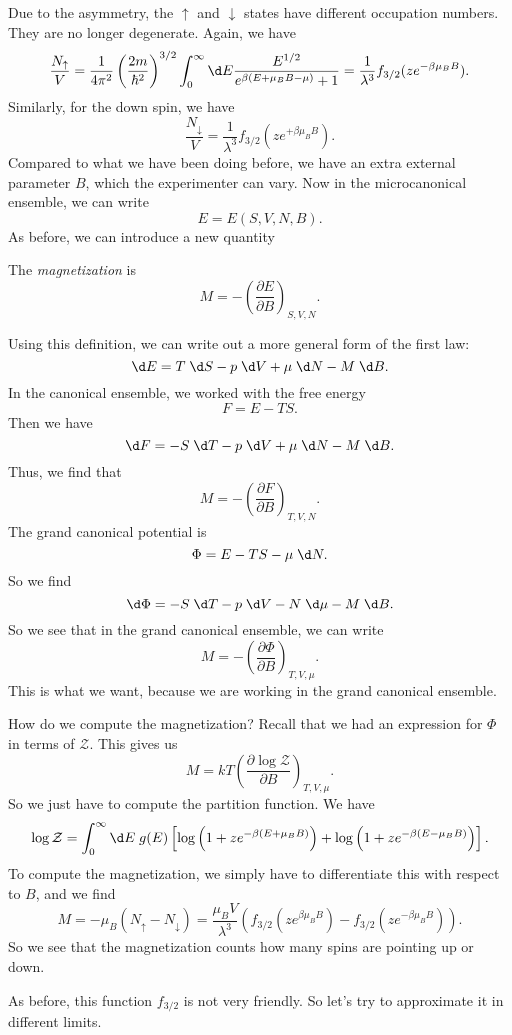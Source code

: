 \documentclass[a4paper]{article}
\begin{document}
Due to the asymmetry, the $\uparrow$ and $\downarrow$ states have different occupation numbers. They are no longer degenerate. Again, we have
\[
  \frac{N_{\uparrow}}{V} = \frac{1}{4\pi^2} \left(\frac{2m}{\hbar^2}\right)^{3/2} \int_0^\infty \d E \frac{E^{1/2}}{e^{\beta(E + \mu_B B - \mu)} + 1} = \frac{1}{\lambda^3} f_{3/2}(z e^{-\beta \mu_B B}).
\]
Similarly, for the down spin, we have
\[
  \frac{N_\downarrow}{V} = \frac{1}{\lambda^3} f_{3/2} (z e^{+\beta \mu_B B}).
\]
Compared to what we have been doing before, we have an extra external parameter $B$, which the experimenter can vary. Now in the microcanonical ensemble, we can write
\[
  E = E(S, V, N, B).
\]
As before, we can introduce a new quantity
\begin{defi}[Magnetization]
  The \emph{magnetization} is
  \[
    M = -\left(\frac{\partial E}{\partial B}\right)_{S, V, N}.
  \]
\end{defi}
Using this definition, we can write out a more general form of the first law:
\[
  \d E = T \;\d S - p \;\d V + \mu \;\d N - M \;\d B.
\]
In the canonical ensemble, we worked with the free energy
\[
  F = E - TS.
\]
Then we have
\[
  \d F = - S \;\d T - p \;\d V + \mu \;\d N - M \;\d B.
\]
Thus, we find that
\[
  M = -\left(\frac{\partial F}{\partial B}\right)_{T, V, N}.
\]
The grand canonical potential is
\[
  \Phi = E - TS - \mu \;\d N.
\]
So we find
\[
  \d\Phi = - S \;\d T - p \;\d V - N \;\d \mu - M \;\d B.
\]
So we see that in the grand canonical ensemble, we can write
\[
  M = -\left(\frac{\partial \Phi}{\partial B}\right)_{T, V, \mu}.
\]
This is what we want, because we are working in the grand canonical ensemble.

How do we compute the magnetization? Recall that we had an expression for $\Phi$ in terms of $\mathcal{Z}$. This gives us
\[
  M = kT \left(\frac{\partial \log \mathcal{Z}}{\partial B}\right)_{T, V, \mu}.
\]
So we just have to compute the partition function. We have
\[
  \log \mathcal{Z} = \int_0^\infty \d E\; g(E) \left[\log \left(1 + ze^{-\beta(E + \mu_B B)}\right) + \log \left(1 + z e^{-\beta (E - \mu_B B)}\right)\right].
\]
To compute the magnetization, we simply have to differentiate this with respect to $B$, and we find
\[
  M = - \mu_B (N_{\uparrow} - N_{\downarrow}) = \frac{\mu_B V}{\lambda^3} (f_{3/2}(z e^{\beta \mu_B B}) - f_{3/2}(z e^{-\beta\mu_B B})).
\]
So we see that the magnetization counts how many spins are pointing up or down.

As before, this function $f_{3/2}$ is not very friendly. So let's try to approximate it in different limits.
\end{document}
